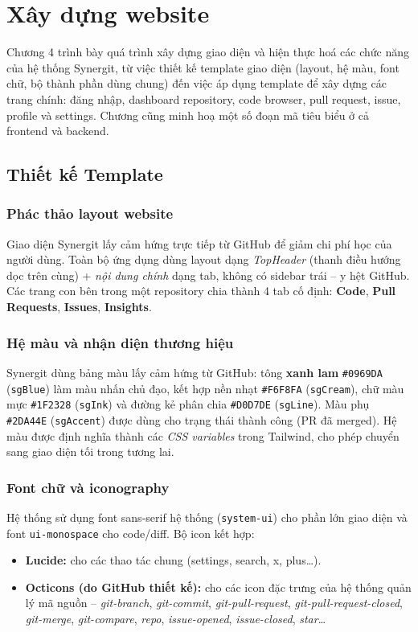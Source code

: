 \chapter{Xây dựng website}

Chương 4 trình bày quá trình xây dựng giao diện và hiện thực hoá các chức năng của hệ thống Synergit, từ việc thiết kế template giao diện (layout, hệ màu, font chữ, bộ thành phần dùng chung) đến việc áp dụng template để xây dựng các trang chính: đăng nhập, dashboard repository, code browser, pull request, issue, profile và settings. Chương cũng minh hoạ một số đoạn mã tiêu biểu ở cả frontend và backend.

\section{Thiết kế Template}

\subsection{Phác thảo layout website}
Giao diện Synergit lấy cảm hứng trực tiếp từ GitHub để giảm chi phí học của người dùng. Toàn bộ ứng dụng dùng layout dạng \textit{TopHeader} (thanh điều hướng dọc trên cùng) + \textit{nội dung chính} dạng tab, không có sidebar trái -- y hệt GitHub. Các trang con bên trong một repository chia thành 4 tab cố định: \textbf{Code}, \textbf{Pull Requests}, \textbf{Issues}, \textbf{Insights}.

\subsection{Hệ màu và nhận diện thương hiệu}
Synergit dùng bảng màu lấy cảm hứng từ GitHub: tông \textbf{xanh lam} \texttt{\#0969DA} (\texttt{sgBlue}) làm màu nhấn chủ đạo, kết hợp nền nhạt \texttt{\#F6F8FA} (\texttt{sgCream}), chữ màu mực \texttt{\#1F2328} (\texttt{sgInk}) và đường kẻ phân chia \texttt{\#D0D7DE} (\texttt{sgLine}). Màu phụ \texttt{\#2DA44E} (\texttt{sgAccent}) được dùng cho trạng thái thành công (PR đã merged). Hệ màu được định nghĩa thành các \textit{CSS variables} trong Tailwind, cho phép chuyển sang giao diện tối trong tương lai.

\subsection{Font chữ và iconography}
Hệ thống sử dụng font sans-serif hệ thống (\texttt{system-ui}) cho phần lớn giao diện và font \texttt{ui-monospace} cho code/diff. Bộ icon kết hợp:
\begin{itemize}
\item \textbf{Lucide:} cho các thao tác chung (settings, search, x, plus\ldots).
\item \textbf{Octicons (do GitHub thiết kế):} cho các icon đặc trưng của hệ thống quản lý mã nguồn -- \textit{git-branch}, \textit{git-commit}, \textit{git-pull-request}, \textit{git-pull-request-closed}, \textit{git-merge}, \textit{git-compare}, \textit{repo}, \textit{issue-opened}, \textit{issue-closed}, \textit{star}\ldots
\end{itemize}

